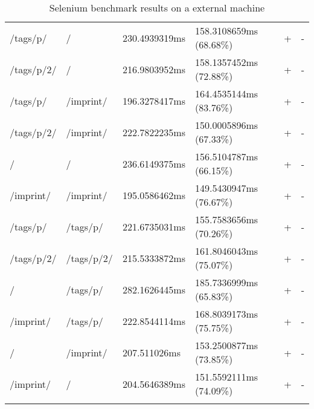 \begin{center}
\begin{longtable}{llllll}
	\hline
	/tags/p/ & / & 230.4939319ms & 158.3108659ms (68.68\%) & + & - \\
	/tags/p/2/ & / & 216.9803952ms & 158.1357452ms (72.88\%) & + & - \\
	/tags/p/ & /imprint/ & 196.3278417ms & 164.4535144ms (83.76\%) & + & - \\
	/tags/p/2/ & /imprint/ & 222.7822235ms & 150.0005896ms (67.33\%) & + & - \\
	\hline
	/ & / & 236.6149375ms & 156.5104787ms (66.15\%) & + & - \\
	/imprint/ & /imprint/ & 195.0586462ms & 149.5430947ms (76.67\%) & + & - \\
	/tags/p/ & /tags/p/ & 221.6735031ms & 155.7583656ms (70.26\%) & + & - \\
	/tags/p/2/ & /tags/p/2/ & 215.5333872ms & 161.8046043ms (75.07\%) & + & - \\
	\hline
	/ & /tags/p/ & 282.1626445ms & 185.7336999ms (65.83\%) & + & - \\
	/imprint/ & /tags/p/ & 222.8544114ms & 168.8039173ms (75.75\%) & + & - \\
	\hline
	/ & /imprint/ & 207.511026ms & 153.2500877ms (73.85\%) & + & - \\
	/imprint/ & / & 204.5646389ms & 151.5592111ms (74.09\%) & + & - \\
	\hline
\caption{Selenium benchmark results on a external machine}
\label{tab:selenium_benchmark_results_external}
\end{longtable}
\end{center}





